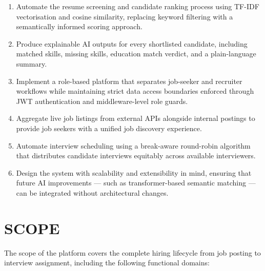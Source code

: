 \documentclass[12pt,a4paper]{report}
\begin{document}
\begin{enumerate}[leftmargin=0.5in, label=(\arabic*), topsep=4pt, itemsep=3pt]
    \item Automate the resume screening and candidate ranking process using TF-IDF vectorisation and cosine similarity, replacing keyword filtering with a semantically informed scoring approach.
    \item Produce explainable AI outputs for every shortlisted candidate, including matched skills, missing skills, education match verdict, and a plain-language summary.
    \item Implement a role-based platform that separates job-seeker and recruiter workflows while maintaining strict data access boundaries enforced through JWT authentication and middleware-level role guards.
    \item Aggregate live job listings from external APIs alongside internal postings to provide job seekers with a unified job discovery experience.
    \item Automate interview scheduling using a break-aware round-robin algorithm that distributes candidate interviews equitably across available interviewers.
    \item Design the system with scalability and extensibility in mind, ensuring that future AI improvements — such as transformer-based semantic matching — can be integrated without architectural changes.
\end{enumerate}

\section{SCOPE}

The scope of the platform covers the complete hiring lifecycle from job posting to interview assignment, including the following functional domains:
\end{document}
